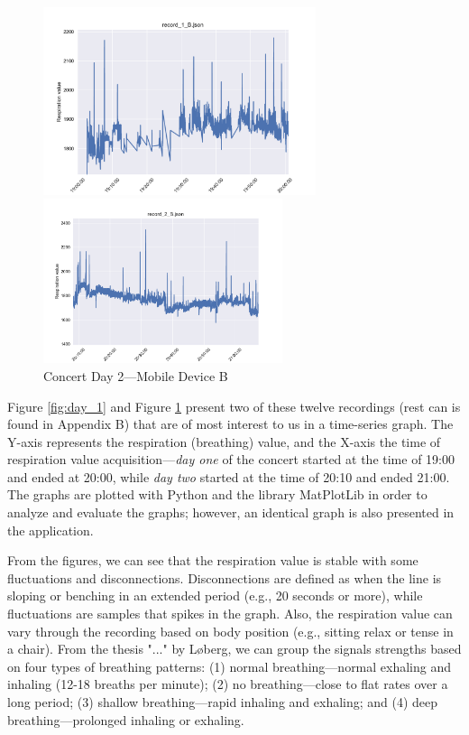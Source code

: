\begin{figure}
\parbox{7cm}{
\includegraphics[width=8cm]{images/Record_1_B.pdf}
\caption{Concert Day 1---Mobile Device B}
\label{fig:day_1}}
\qquad
\begin{minipage}{6cm}
\includegraphics[width=7cm]{images/Record_2_B.pdf}
\caption{Concert Day 2---Mobile Device B}
\label{fig:day_2}
\end{minipage}
\end{figure}

Figure \ref{fig:day_1} and Figure \ref{fig:day_2} present two of these twelve recordings (rest can is found in Appendix B) that are of most interest to us in a time-series graph. The Y-axis represents the respiration (breathing) value, and the X-axis the time of respiration value acquisition---\textit{day one} of the concert started at the time of 19:00 and ended at 20:00, while \textit{day two} started at the time of 20:10 and ended 21:00. The graphs are plotted with Python and the library MatPlotLib in order to analyze and evaluate the graphs; however, an identical graph is also presented in the application.

From the figures, we can see that the respiration value is stable with some fluctuations and disconnections. Disconnections are defined as when the line is sloping or benching in an extended period (e.g., 20 seconds or more), while fluctuations are samples that spikes in the graph. Also, the respiration value can vary through the recording based on body position (e.g., sitting relax or tense in a chair). From the thesis "..." by Løberg, we can group the signals strengths based on four types of breathing patterns: (1) normal breathing---normal exhaling and inhaling (12-18 breaths per minute); (2) no breathing---close to flat rates over a long period; (3) shallow breathing---rapid inhaling and exhaling; and (4) deep breathing---prolonged inhaling or exhaling.

